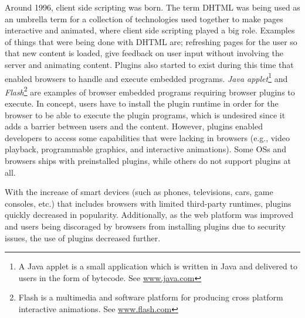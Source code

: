 \documentclass[a4paper,11pt]{kth-mag}
\begin{document}
        Around 1996, client side scripting was born.
        The term \gls{DHTML} was being used as an umbrella term for a collection of technologies used together to make pages interactive and animated, where client side scripting played a big role.
        Examples of things that were being done with \gls{DHTML} are; refreshing pages for the user so that new content is loaded, give feedback on user input without involving the server and animating content.
        Plugins also started to exist during this time that enabled \glspl{browser} to handle and execute embedded programs.
        \emph{Java applet}\footnote{A Java applet is a small application which is written in Java and delivered to users in the form of bytecode. See \url{www.java.com}} and \emph{Flash}\footnote{Flash is a multimedia and software platform for producing cross platform interactive animations. See \url{www.flash.com}} are examples of \gls{browser} embedded programs requiring \gls{browser} plugins to execute.
        In concept, users have to install the plugin runtime in order for the \gls{browser} to be able to execute the plugin programs, which is undesired since it adds a barrier between users and the content.
        However, plugins enabled developers to access some capabilities that were lacking in \glspl{browser} (e.g., video playback, programmable graphics, and interactive animations).
        Some \glspl{OS} and \glspl{browser} ships with preinstalled plugins, while others do not support plugins at all.

        With the increase of smart devices (such as phones, televisions, cars, game consoles, etc.) that includes \glspl{browser} with limited \gls{third-party} runtimes, plugins quickly decreased in popularity.
        Additionally, as the \gls{web} platform was improved and users being discoraged by \glspl{browser} from installing plugins due to security issues, the use of plugins decreased further.
\end{document}
